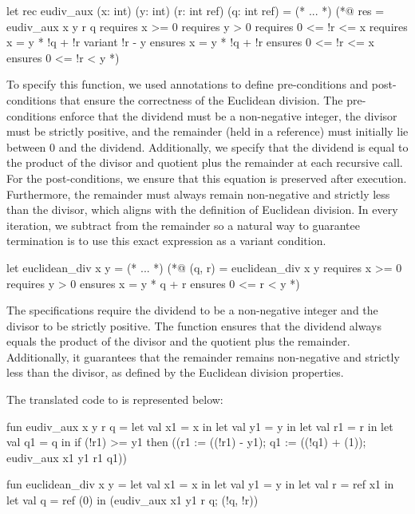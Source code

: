 \begin{gospell}
let rec eudiv_aux (x: int) (y: int) (r: int ref) (q: int ref) = (* ... *)
(*@ res = eudiv_aux x y r q
    requires x >= 0
    requires y > 0
    requires 0 <= !r <= x
    requires x = y * !q + !r
    variant !r - y
    ensures x = y * !q + !r
    ensures 0 <= !r <= x
    ensures 0 <= !r < y *)
\end{gospell}

To specify this function, we used \gospel annotations to define pre-conditions and post-conditions that ensure the correctness of 
the Euclidean division. The pre-conditions enforce that the dividend must be a non-negative integer, the divisor must be strictly 
positive, and the remainder (held in a reference) must initially lie between 0 and the dividend. Additionally, we specify that the 
dividend is equal to the product of the divisor and quotient plus the remainder at each recursive call. For the post-conditions, we 
ensure that this equation is preserved after execution. Furthermore, the remainder must always remain non-negative and strictly less 
than the divisor, which aligns with the definition of Euclidean division. In every iteration, we subtract  from the
remainder  so a natural way to guarantee termination is to use this exact expression as a variant condition.

\begin{gospell}
let euclidean_div x y = (* ... *)
(*@ (q, r) = euclidean_div x y
    requires x >= 0
    requires y > 0
    ensures x = y * q + r
    ensures 0 <= r < y *)
\end{gospell}

The \gospel specifications require the dividend to be a non-negative integer and the divisor to be strictly positive. The function 
ensures that the dividend always equals the product of the divisor and the quotient plus the remainder. Additionally, it guarantees 
that the remainder remains non-negative and strictly less than the divisor, as defined by the Euclidean division properties.

The translated code to \cml is represented below:

\begin{cakeml}
fun eudiv_aux x y r q = let val x1 = x in
  let val y1 = y in
  let val r1 = r in
  let val q1 = q in
  if (!r1) >= y1
  then ((r1 := ((!r1) - y1); q1 := ((!q1) + (1)); eudiv_aux x1 y1 r1 q1))

fun euclidean_div x y =
  let val x1 = x in
  let val y1 = y in
  let val r = ref x1 in
  let val q = ref (0) in (eudiv_aux x1 y1 r q; (!q, !r))
\end{cakeml}

